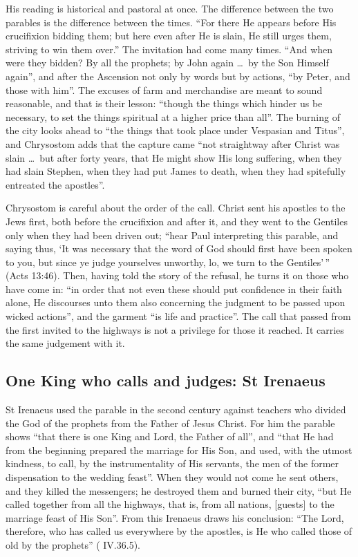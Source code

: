 His reading is historical and pastoral at once. The difference between the two
parables is the difference between the times. ``For there He appears before
His crucifixion bidding them; but here even after He is slain, He still urges
them, striving to win them over.'' The invitation had come many times. ``And
when were they bidden? By all the prophets; by John again \dots\ by the Son
Himself again'', and after the Ascension not only by words but by actions,
``by Peter, and those with him''. The excuses of farm and merchandise are
meant to sound reasonable, and that is their lesson: ``though the things which
hinder us be necessary, to set the things spiritual at a higher price than
all''. The burning of the city looks ahead to ``the things that took place
under Vespasian and Titus'', and Chrysostom adds that the capture came ``not
straightway after Christ was slain \dots\ but after forty years, that He might
show His long suffering, when they had slain Stephen, when they had put James
to death, when they had spitefully entreated the apostles''.

Chrysostom is careful about the order of the call. Christ sent his apostles to
the Jews first, both before the crucifixion and after it, and they went to the
Gentiles only when they had been driven out; ``hear Paul interpreting this
parable, and saying thus, `It was necessary that the word of God should first
have been spoken to you, but since ye judge yourselves unworthy, lo, we turn to
the Gentiles'\,'' (Acts 13:46). Then, having told the story of the refusal, he
turns it on those who have come in: ``in order that not even these should put
confidence in their faith alone, He discourses unto them also concerning the
judgment to be passed upon wicked actions'', and the garment ``is life and
practice''. The call that passed from the first invited to the highways is not
a privilege for those it reached. It carries the same judgement with it.

\subsection{One King who calls and judges: St Irenaeus}

St Irenaeus used the parable in the second century against teachers who
divided the God of the prophets from the Father of Jesus Christ. For him the
parable shows ``that there is one King and Lord, the Father of all'', and
``that He had from the beginning prepared the marriage for His Son, and used,
with the utmost kindness, to call, by the instrumentality of His servants, the
men of the former dispensation to the wedding feast''. When they would not come
he sent others, and they killed the messengers; he destroyed them and burned
their city, ``but He called together from all the highways, that is, from all
nations, [guests] to the marriage feast of His Son''. From this Irenaeus draws
his conclusion: ``The Lord, therefore, who has called us everywhere by the
apostles, is He who called those of old by the prophets''
( IV.36.5).

